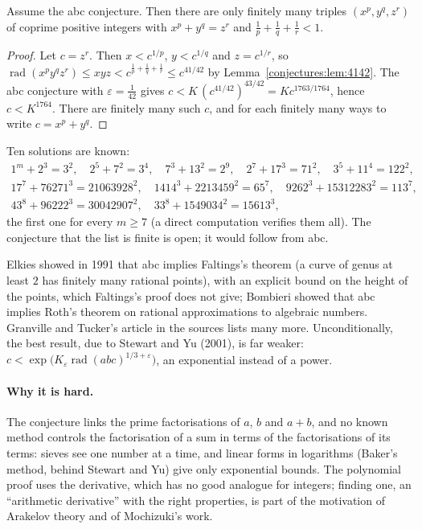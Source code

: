 \begin{theorem}\label{conjectures:thm:fermatcatalan}
Assume the abc conjecture. Then there are only finitely many triples $(x^p,y^q,z^r)$ of coprime positive integers with $x^p+y^q=z^r$ and
$\frac1p+\frac1q+\frac1r<1$.
\end{theorem}
\begin{proof}
Let $c=z^r$. Then $x<c^{1/p}$, $y<c^{1/q}$ and $z=c^{1/r}$, so $\operatorname{rad}(x^py^qz^r)\le xyz<c^{\frac1p+\frac1q+\frac1r}\le c^{41/42}$ by
Lemma~\ref{conjectures:lem:4142}. The abc conjecture with $\varepsilon=\frac1{42}$ gives $c<K\,(c^{41/42})^{43/42}=Kc^{1763/1764}$, hence $c<K^{1764}$. There are
finitely many such $c$, and for each finitely many ways to write $c=x^p+y^q$.
\end{proof}

Ten solutions are known:
\[
\begin{gathered}
1^m+2^3=3^2,\quad 2^5+7^2=3^4,\quad 7^3+13^2=2^9,\quad 2^7+17^3=71^2,\quad 3^5+11^4=122^2,\\
17^7+76271^3=21063928^2,\quad 1414^3+2213459^2=65^7,\quad 9262^3+15312283^2=113^7,\\
43^8+96222^3=30042907^2,\quad 33^8+1549034^2=15613^3,
\end{gathered}
\]
the first one for every $m\ge7$ (a direct computation verifies them all). The conjecture that the list is finite is open; it would follow from abc.

\begin{remark}\label{conjectures:rem:abcmore}
Elkies showed in 1991 that abc implies Faltings's theorem (a curve of genus at least $2$ has finitely many rational points), with an explicit bound on
the height of the points, which Faltings's proof does not give; Bombieri showed that abc implies Roth's theorem on rational approximations to algebraic
numbers. Granville and Tucker's article in the sources lists many more. Unconditionally, the best result, due to Stewart and Yu (2001), is far weaker:
$c<\exp\bigl(K_\varepsilon\operatorname{rad}(abc)^{1/3+\varepsilon}\bigr)$, an exponential instead of a power.
\end{remark}

\paragraph{Why it is hard.} The conjecture links the prime factorisations of $a$, $b$ and $a+b$, and no known method controls the factorisation of a sum
in terms of the factorisations of its terms: sieves see one number at a time, and linear forms in logarithms (Baker's method, behind Stewart and Yu)
give only exponential bounds. The polynomial proof uses the derivative, which has no good analogue for integers; finding one, an ``arithmetic
derivative'' with the right properties, is part of the motivation of Arakelov theory and of Mochizuki's work.

